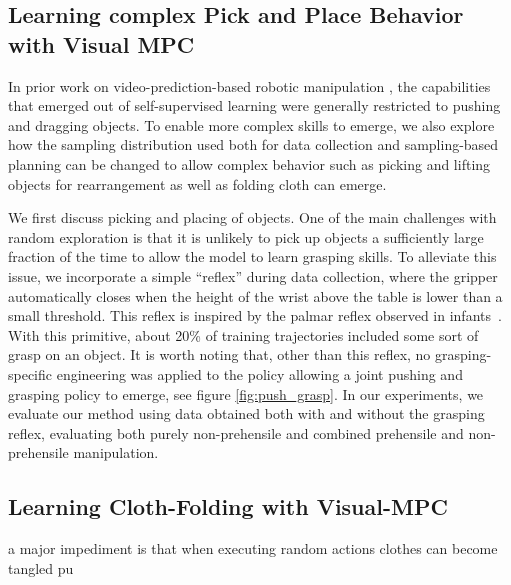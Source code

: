 \subsection{Learning complex Pick and Place Behavior with Visual MPC}
In prior work on video-prediction-based robotic manipulation \cite{sna, foresight}, the capabilities that emerged out of self-supervised learning were generally restricted to pushing and dragging objects. To enable more complex skills to emerge, we also explore how the sampling distribution used both for data collection and sampling-based planning can be changed to allow complex behavior such as picking and lifting objects for rearrangement as well as folding cloth can emerge. 

We first discuss picking and placing of objects. One of the main challenges with random exploration is that it is unlikely to pick up objects a sufficiently large fraction of the time to allow the model to learn grasping skills. To alleviate this issue, we incorporate a simple ``reflex'' during data collection, where the gripper automatically closes when the height of the wrist above the table is lower than a small threshold. This reflex is inspired by the palmar reflex observed in infants~\cite{grasping_fetal}. With this primitive, about 20\% of training trajectories included some sort of grasp on an object. It is worth noting that, other than this reflex, no grasping-specific engineering was applied to the policy allowing a joint pushing and grasping policy to emerge, see figure \ref{fig:push_grasp}. In our experiments, we evaluate our method using data obtained both with and without the grasping reflex, evaluating both purely non-prehensile and combined prehensile and non-prehensile manipulation.

\subsection{Learning Cloth-Folding with Visual-MPC}
 a major impediment is that when executing random actions clothes can become tangled pu

